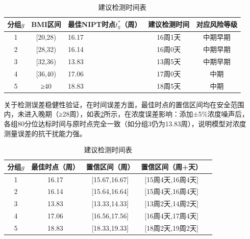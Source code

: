 \documentclass[withoutpreface,bwprint]{cumcmthesis} %
\begin{document}
\begin{table}[H]
    \centering  %
    \caption{建议检测时间表}  %
    \label{tab:建议检测时间表}  %
    \begin{threeparttable}
        \begin{tabularx}{0.94\textwidth}{c c l c c }
            \toprule[1.5pt]
            \textbf{分组$g$} & \textbf{BMI区间} & \textbf{最佳NIPT时点$t_g^*$（周）} & \textbf{建议检测时间} & \textbf{对应风险等级}\\ 
            \midrule[1pt]
            1 & [20,28)  & 16.17 & 16周1天  & 中期早期    \\
            2 & [28,32)  & 16.14 & 16周0天  & 中期早期    \\
            3 & [32,36)  & 13.83 & 13周5天  & 中期早期\\
            4 & [36,40)  & 17.06 & 17周0天  & 中期        \\
            5 & ≥40      & 18.83 & 18周5天  & 中期        \\
            \bottomrule[1.5pt]
        \end{tabularx}
    \end{threeparttable}
\end{table}


关于检测误差稳健性验证，在时间误差方面，最佳时点的置信区间均在安全范围内，未进入晚期（≥28周），如表\ref{tab:误差检验}所示，在浓度误差影响：添加±5\%浓度噪声后，各组80分位达标时间与原时点完全一致（如分组3仍为13.83周），说明模型对浓度测量误差的抗干扰能力强。

\begin{table}[H]
    \centering  %
    \caption{建议检测时间表}  %
    \label{tab:误差检验}  %
    \begin{threeparttable}
        \begin{tabularx}{0.8\textwidth}{c c c c c }
            \toprule[1.5pt]
            \textbf{分组$g$} & \textbf{最佳时点（周）} & \textbf{置信区间（周）} & \textbf{置信区间（周+天）}\\ 
            \midrule[1pt]
            1 & 16.17 & [15.67,16.67] & [15周4天,16周4天] \\ 
            2 & 16.14 & [15.64,16.64] & [15周4天,16周4天] \\ 
            3 & 13.83 & [13.33,14.33] & [13周2天,14周2天] \\ 
            4 & 17.06 & [16.56,17.56] & [16周4天,17周4天] \\ 
            5 & 18.83 & [18.33,19.33] & [18周2天,19周2天] \\ 
            \bottomrule[1.5pt]
        \end{tabularx}
    \end{threeparttable}
\end{table}
\end{document}

